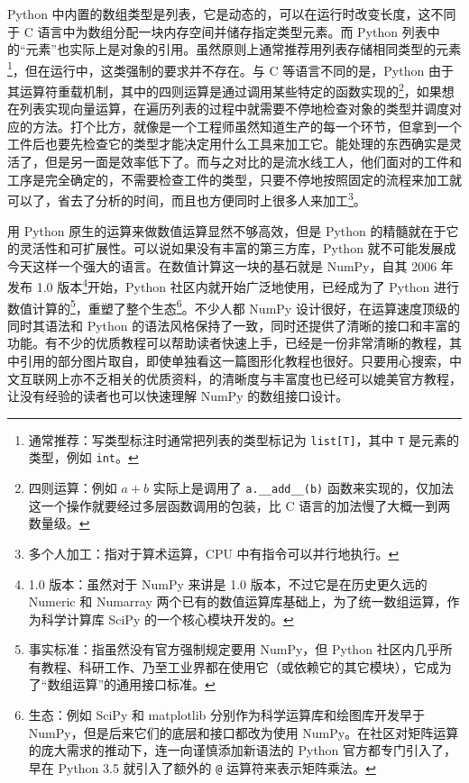 Python 中内置的数组类型是列表，它是动态的，可以在运行时改变长度，这不同于 C 语言中为数组分配一块内存空间并储存指定类型元素。而 Python 列表中的“元素”也实际上是对象的引用。虽然原则上通常推荐用列表存储相同类型的元素\footnote{通常推荐：写类型标注时通常把列表的类型标记为 \texttt{list[T]}，其中 \texttt{T} 是元素的类型，例如 \texttt{int}。}，但在运行中，这类强制的要求并不存在。与 C 等语言不同的是，Python 由于其运算符重载机制，其中的四则运算是通过调用某些特定的函数实现的\footnote{四则运算：例如 $a + b$ 实际上是调用了 \texttt{a.\_\_add\_\_(b)} 函数来实现的，仅加法这一个操作就要经过多层函数调用的包装，比 C 语言的加法慢了大概一到两数量级。}，如果想在列表实现向量运算，在遍历列表的过程中就需要不停地检查对象的类型并调度对应的方法。打个比方，就像是一个工程师虽然知道生产的每一个环节，但拿到一个工件后也要先检查它的类型才能决定用什么工具来加工它。能处理的东西确实是灵活了，但是另一面是效率低下了。而与之对比的是流水线工人，他们面对的工件和工序是完全确定的，不需要检查工件的类型，只要不停地按照固定的流程来加工就可以了，省去了分析的时间，而且也方便同时上很多人来加工\footnote{多个人加工：指对于算术运算，CPU 中有指令可以并行地执行。}。

用 Python 原生的运算来做数值运算显然不够高效，但是 Python 的精髓就在于它的灵活性和可扩展性。可以说如果没有丰富的第三方库，Python 就不可能发展成今天这样一个强大的语言。在数值计算这一块的基石就是 NumPy，自其 2006 年发布 1.0 版本\footnote{1.0 版本：虽然对于 NumPy 来讲是 1.0 版本，不过它是在历史更久远的 Numeric 和 Numarray 两个已有的数值运算库基础上，为了统一数组运算，作为科学计算库 SciPy 的一个核心模块开发的。}开始，Python 社区内就开始广泛地使用，已经成为了 Python 进行数值计算的\footnote{事实标准：指虽然没有官方强制规定要用 NumPy，但 Python 社区内几乎所有教程、科研工作、乃至工业界都在使用它（或依赖它的其它模块），它成为了“数组运算”的通用接口标准。}，重塑了整个生态\footnote{生态：例如 SciPy 和 matplotlib 分别作为科学运算库和绘图库开发早于 NumPy，但是后来它们的底层和接口都改为使用 NumPy。在社区对矩阵运算的庞大需求的推动下，连一向谨慎添加新语法的 Python 官方都专门引入了，早在 Python 3.5 就引入了额外的 \texttt{@} 运算符来表示矩阵乘法。}。不少人都 NumPy 设计很好，在运算速度顶级的同时其语法和 Python 的语法风格保持了一致，同时还提供了清晰的接口和丰富的功能。有不少的优质教程可以帮助读者快速上手，已经是一份非常清晰的教程，其中引用的部分图片取自，即使单独看这一篇图形化教程也很好。只要用心搜索，中文互联网上亦不乏相关的优质资料，的清晰度与丰富度也已经可以媲美官方教程，让没有经验的读者也可以快速理解 NumPy 的数组接口设计。


